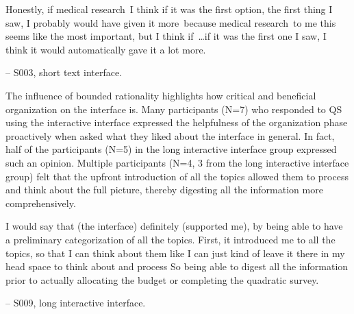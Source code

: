 \begin{displayquote}
    Honestly, if medical research~\bracketellipsis I think if it was the first option, the first thing I saw, I probably would have given it more~\bracketellipsis because medical research~\bracketellipsis to me this seems like the most important, but I think if~\ldots if it was the first one I saw, I think it would automatically gave it a lot more.
        
    \noindent \hfill -- S003, short text interface.
\end{displayquote}

    

The influence of bounded rationality highlights how critical and beneficial organization on the interface is. Many participants (N=7) who responded to QS using the interactive interface expressed the helpfulness of the organization phase proactively when asked what they liked about the interface in general. In fact, half of the participants (N=5) in the long interactive interface group expressed such an opinion. Multiple participants (N=4, 3 from the long interactive interface group) felt that the upfront introduction of all the topics allowed them to process and think about the full picture, thereby digesting all the information more comprehensively. 

\begin{displayquote}
I would say that (the interface) definitely (supported me), by being able to have a preliminary categorization of all the topics. First, it introduced me to all the topics, so that I can think about them like I can just kind of leave it there in my head space to think about and process \bracketellipsis So being able to digest all the information prior to actually allocating the budget or completing the quadratic survey.

\noindent \hfill -- S009, long interactive interface.
\end{displayquote}

